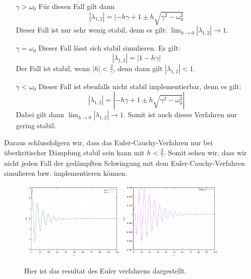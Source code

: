\documentclass[ngerman]{scrartcl}
\begin{document}
\begin{itemize}
 	\item[$\gamma > \omega_0$] Für diesen Fall gilt dann  \begin{equation*}  |\lambda_{1,2}| = |-h\gamma + 1 \pm h\sqrt{\gamma^2-\omega_0^2}  \end{equation*}  Dieser Fall ist nur sehr wenig stabil, denn es gilt: $\lim_{h \to 0} |\lambda_{1,2}| \rightarrow 1$.
	\item[$\gamma = \omega_0$] Dieser Fall lässt sich stabil simulieren. Es gilt:  \begin{equation*}  |\lambda_{1,2}| = | 1 - h\gamma|  \end{equation*}  Der Fall ist stabil, wenn $|h| < \frac{2}{\gamma}$, denn dann gilt $|\lambda_{1,2}| < 1$.
	\item[$\gamma < \omega_0$] Dieser Fall ist ebenfalls nicht stabil implementierbar, denn es gilt:  \begin{equation*}  |\lambda_{1,2}| = |-h\gamma + 1 \pm h\sqrt{\gamma^2 - \omega_0^2}|  \end{equation*}  Dabei gilt dann $\lim_{h \to 0} |\lambda_{1,2}| \rightarrow 1$. Somit ist auch dieses Verfahren nur gering stabil.
\end{itemize}
Daraus schlussfolgern wir, dass das Euler-Cauchy-Verfahren nur bei überkritischer Dämpfung stabil sein kann mit $h<\frac{2}{\gamma}$. Somit sehen wir, dass wir nicht jeden Fall der gedämpften Schwingung mit dem Euler-Cauchy-Verfahren simulieren bzw. implementieren können.
\begin{figure}[htbp]
	\centering
	\includegraphics[width=0.45\textwidth]{euler}
	\includegraphics[width=0.45\textwidth]{euler_fehler}
	\caption[$f{ext}$]{Hier ist das resultat des Euler verfahrens dargestellt.}
	\label{fig:euler}
\end{figure}
\end{document}
